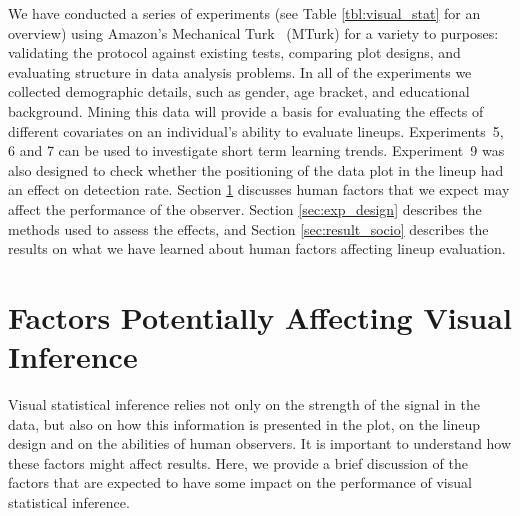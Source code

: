 \documentclass[10pt]{article}\usepackage[]{graphicx}\usepackage[]{color}
\begin{document}
We have conducted a series of experiments (see Table \ref{tbl:visual_stat} for an overview)
using Amazon's Mechanical Turk~\citep{turk} (MTurk) for a variety to purposes: validating the protocol against existing tests, comparing plot designs, and evaluating structure in data analysis problems. In all of the experiments we collected demographic details, such as gender, age bracket, and educational background.  Mining this data will provide a basis for evaluating
the effects of different covariates on an individual's ability to evaluate lineups.  Experiments~5, 6 and 7 can be used to investigate short term learning trends. Experiment~9 was also designed to check whether the  positioning of the  data plot in the lineup had an effect on detection rate. 
Section \ref{sec:factor_performance} discusses human factors that we expect may affect the performance of the observer. Section \ref{sec:exp_design} describes the methods used to assess the effects, and Section \ref{sec:result_socio} describes the results on what we have learned about human factors affecting lineup evaluation.




\section{Factors Potentially Affecting Visual Inference} \label{sec:factor_performance} 

Visual statistical inference relies not only on the strength of the signal in the data, but also on how this information is presented in the plot, on the lineup design and on the abilities of human observers. It is important to understand how these factors might affect results.  Here, we provide a brief discussion %
of the factors that are expected to have some impact on the performance of visual statistical inference.  

\end{document}
